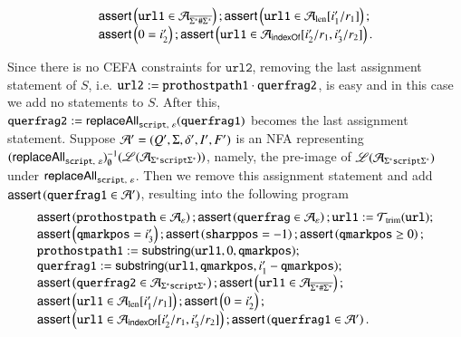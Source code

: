 {\begin{description}
\[\begin{array}{l}
		\textsf{assert}\left(\mathtt{url1} \in  \mathcal{A}_{\overline{\Sigma^*\#\Sigma^*}}\right); \textsf{assert}\left(\mathtt{url1} \in \mathcal{A}_{\rm len}[i'_1/r_1]\right); \\
		\textsf{assert}\left(0= i'_2\right); \textsf{assert}\left(\mathtt{url1} \in \mathcal{A}_{\mathsf{indexOf}}[i'_2/r_1, i'_3/r_2]\right).
		\end{array}
		\]
		\item[Step IV.] Since there is no CEFA constraints for $\mathtt{url2}$, removing the last assignment statement of $S$, i.e. $\mathtt{url2} := \mathtt{prothostpath1} \cdot \mathtt{querfrag2}$, is easy and in this case we add no statements to $S$. After this, $\mathtt{querfrag2} := \mathsf{replaceAll}_{\mathtt{script},\ \varepsilon}(\mathtt{querfrag1})$ becomes the last assignment statement. Suppose $\mathcal{A}'=(Q', \Sigma, \delta', I', F')$ is an NFA representing $(\mathsf{replaceAll}_{\mathtt{script},\ \varepsilon})^{-1}_\emptyset(\mathscr{L}(\mathcal{A}_{\Sigma^*\mathtt{script}\Sigma^*}))$, namely, the pre-image of $\mathscr{L}(\mathcal{A}_{\Sigma^*\mathtt{script}\Sigma^*})$ under $\mathsf{replaceAll}_{\mathtt{script},\ \varepsilon}$. Then we remove this assignment statement and add $\textsf{assert}\left(\mathtt{querfrag1 \in \mathcal{A}'}\right)$, resulting into the following program
		\[ 
		\begin{array}{l}
		\textsf{assert}\left(\mathtt{prothostpath} \in \mathcal{A}_\varepsilon\right); \textsf{assert}\left(\mathtt{querfrag} \in \mathcal{A}_\varepsilon\right); \mathtt{url1} := \mathcal{T}_{\rm trim}(\mathtt{url}); \\
		\textsf{assert}\left(\mathtt{qmarkpos} = i'_3\right); \textsf{assert}\left(\mathtt{sharppos} =-1 \right); \textsf{assert}\left(\mathtt{qmarkpos} \ge 0\right); \\ 
		\mathtt{prothostpath1} := \mathsf{substring}(\mathtt{url1}, 0, \mathtt{qmarkpos});\\
		\mathtt{querfrag1} := \mathsf{substring}(\mathtt{url1, qmarkpos}, i'_1 - \mathtt{qmarkpos});\\
		\textsf{assert}\left(\mathtt{querfrag2} \in  \mathcal{A}_{\Sigma^*\mathtt{script}\Sigma^*}\right);  
		\textsf{assert}\left(\mathtt{url1} \in  \mathcal{A}_{\overline{\Sigma^*\#\Sigma^*}}\right); \\
		\textsf{assert}\left(\mathtt{url1} \in \mathcal{A}_{\rm len}[i'_1/r_1]\right);  \textsf{assert}\left(0= i'_2\right); \\
		\textsf{assert}\left(\mathtt{url1} \in \mathcal{A}_{\mathsf{indexOf}}[i'_2/r_1, i'_3/r_2]\right);  \textsf{assert}\left(\mathtt{querfrag1} \in \mathcal{A}'\right).
		\end{array}
		\]
		

\end{description}}
